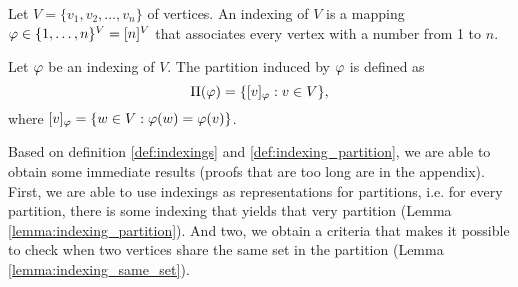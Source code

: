 \begin{definition}
    Let $V = \{ v_1,v_2,\dots, v_n \}$ of vertices. An indexing of $V$ is a mapping $\varphi \in \{ 1,\dots,n \}^V = [n]^V$ that associates every vertex with a number from 1 to $n$. \label{def:indexings}
\end{definition}

\begin{definition}
    Let $\varphi$ be an indexing of $V$. The partition induced by $\varphi$ is defined as
    \begin{equation}
        \Pi(\varphi)= \{ [v]_\varphi : v \in V \}, \label{eq:indexing}
    \end{equation}
    where $[v]_\varphi = \{ w \in V : \varphi(w) = \varphi(v) \}$. \label{def:indexing_partition}
\end{definition}

Based on definition \ref{def:indexings} and \ref{def:indexing_partition}, we are able to obtain some immediate results (proofs that are too long are in the appendix). First, we are able to use indexings as representations for partitions, i.e. for every partition, there is some indexing that yields that very partition (Lemma \ref{lemma:indexing_partition}). And two, we obtain a criteria that makes it possible to check when two vertices share the same set in the partition (Lemma \ref{lemma:indexing_same_set}).  

